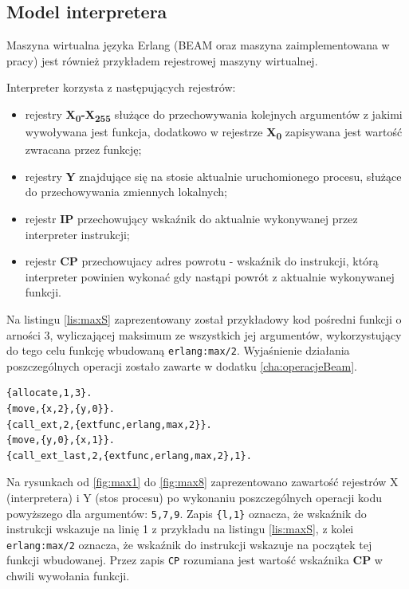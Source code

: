 \subsection{Model interpretera}
\label{sub:interpreterModel}

Maszyna wirtualna języka Erlang (BEAM oraz maszyna zaimplementowana w pracy) jest również przykładem rejestrowej maszyny wirtualnej.

Interpreter korzysta z następujących rejestrów:
\begin{itemize}
\item rejestry \textbf{X\textsubscript{0}-X\textsubscript{255}} służące do przechowywania kolejnych argumentów z jakimi wywoływana jest funkcja, dodatkowo w rejestrze \textbf{X\textsubscript{0}} zapisywana jest wartość zwracana przez funkcję;
\item rejestry \textbf{Y} znajdujące się na stosie aktualnie uruchomionego procesu, służące do przechowywania zmiennych lokalnych;
\item rejestr \textbf{IP} przechowujący wskaźnik do aktualnie wykonywanej przez interpreter instrukcji;
\item rejestr \textbf{CP} przechowujacy adres powrotu - wskaźnik do instrukcji, którą interpreter powinien wykonać gdy nastąpi powrót z aktualnie wykonywanej funkcji.
\end{itemize}

Na listingu \ref{lis:maxS} zaprezentowany został przykładowy kod pośredni funkcji o arności 3, wyliczającej maksimum ze wszystkich jej argumentów, wykorzystujący do tego celu funkcję wbudowaną \texttt{erlang:max/2}. Wyjaśnienie działania poszczególnych operacji zostało zawarte w dodatku \ref{cha:operacjeBeam}.

\begin{lstlisting}[style=erlang, caption=Kod pośredni funkcji zwracającej maksimum z trzech argumentów, label=lis:maxS]
{allocate,1,3}.
{move,{x,2},{y,0}}.
{call_ext,2,{extfunc,erlang,max,2}}.
{move,{y,0},{x,1}}.
{call_ext_last,2,{extfunc,erlang,max,2},1}.
\end{lstlisting}

Na rysunkach od \ref{fig:max1} do \ref{fig:max8} zaprezentowano zawartość rejestrów X (interpretera) i Y (stos procesu) po wykonaniu poszczególnych operacji kodu powyższego dla argumentów: \texttt{5,7,9}. Zapis \texttt{\{l,1\}} oznacza, że wskaźnik do instrukcji wskazuje na linię 1 z przykładu na listingu \ref{lis:maxS}, z kolei \texttt{erlang:max/2} oznacza, że wskaźnik do instrukcji wskazuje na początek tej funkcji wbudowanej. Przez zapis \texttt{CP} rozumiana jest wartość wskaźnika \textbf{CP} w chwili wywołania funkcji. 


